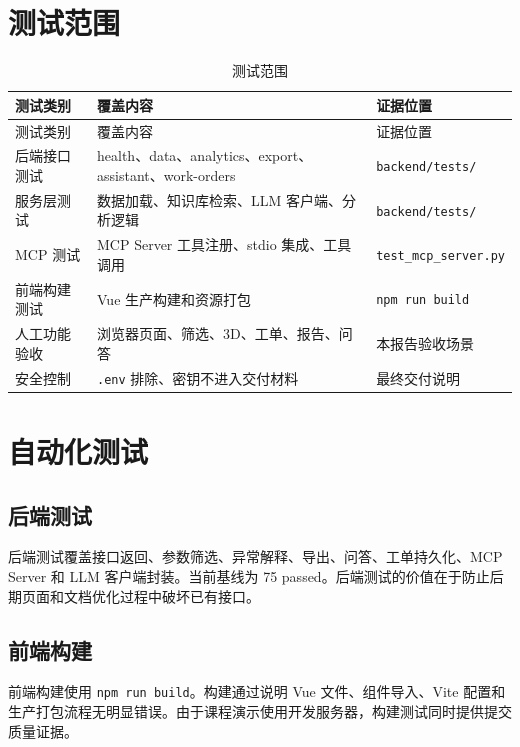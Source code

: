 \documentclass[12pt,a4paper]{ctexart}
\newcommand{\code}[1]{{\footnotesize\nolinkurl{#1}}}
\begin{document}
\section{测试范围}
\begin{longtable}{p{3.2cm}p{6cm}p{4.6cm}}
\caption{测试范围}\\
\toprule
测试类别 & 覆盖内容 & 证据位置 \\
\midrule
\endfirsthead
\toprule
测试类别 & 覆盖内容 & 证据位置 \\
\midrule
\endhead
后端接口测试 & health、data、analytics、export、assistant、work-orders & \code{backend/tests/} \\
服务层测试 & 数据加载、知识库检索、LLM 客户端、分析逻辑 & \code{backend/tests/} \\
MCP 测试 & MCP Server 工具注册、stdio 集成、工具调用 & \code{test_mcp_server.py} \\
前端构建测试 & Vue 生产构建和资源打包 & \code{npm run build} \\
人工功能验收 & 浏览器页面、筛选、3D、工单、报告、问答 & 本报告验收场景 \\
安全控制 & \code{.env} 排除、密钥不进入交付材料 & 最终交付说明 \\
\bottomrule
\end{longtable}

\section{自动化测试}
\subsection{后端测试}
后端测试覆盖接口返回、参数筛选、异常解释、导出、问答、工单持久化、MCP Server 和 LLM 客户端封装。当前基线为 75 passed。后端测试的价值在于防止后期页面和文档优化过程中破坏已有接口。

\subsection{前端构建}
前端构建使用 \code{npm run build}。构建通过说明 Vue 文件、组件导入、Vite 配置和生产打包流程无明显错误。由于课程演示使用开发服务器，构建测试同时提供提交质量证据。
\end{document}

